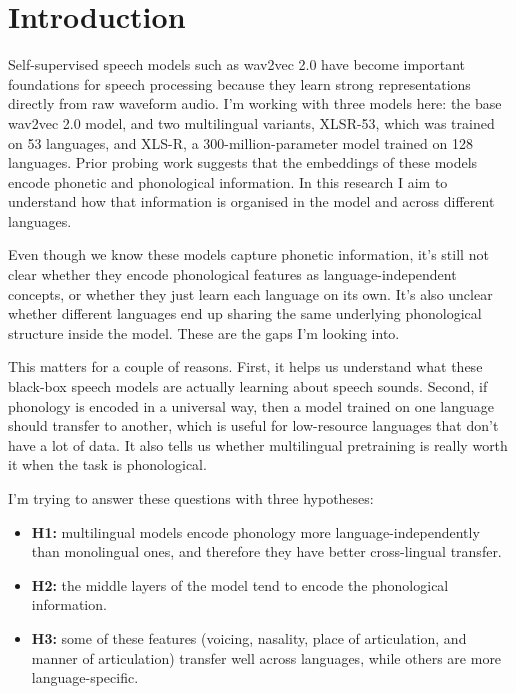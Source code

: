 \documentclass[twoside,11pt]{article}
\begin{document}
\section{Introduction}

Self-supervised speech models such as wav2vec 2.0 have become important
foundations for speech processing because they learn strong representations
directly from raw waveform audio. I'm working with three models here: the base
wav2vec 2.0 model, and two multilingual variants, XLSR-53, which was trained on 53
languages, and XLS-R, a 300-million-parameter model trained on 128 languages.
Prior probing work suggests that the embeddings of these models encode phonetic
and phonological information. In this research I aim to understand how that
information is organised in the model and across different languages.

Even though we know these models capture phonetic information, it's still not
clear whether they encode phonological features as language-independent concepts,
or whether they just learn each language on its own. It's also unclear whether
different languages end up sharing the same underlying phonological structure
inside the model. These are the gaps I'm looking into.

This matters for a couple of reasons. First, it helps us understand what these
black-box speech models are actually learning about speech sounds. Second, if
phonology is encoded in a universal way, then a model trained on one language
should transfer to another, which is useful for low-resource languages that don't
have a lot of data. It also tells us whether multilingual pretraining is really
worth it when the task is phonological.

I'm trying to answer these questions with three hypotheses:

\begin{itemize}
  \item \textbf{H1:} multilingual models encode phonology more
        language-independently than monolingual ones, and therefore they have
        better cross-lingual transfer.
  \item \textbf{H2:} the middle layers of the model tend to encode the
        phonological information.
  \item \textbf{H3:} some of these features (voicing, nasality, place of
        articulation, and manner of articulation) transfer well across languages,
        while others are more language-specific.
\end{itemize}
\end{document}
